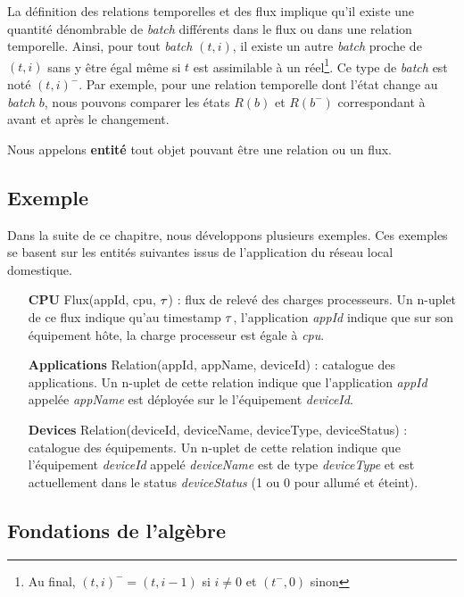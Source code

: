La définition des relations temporelles et des flux implique qu'il existe une quantité dénombrable de \textit{batch} différents dans le flux ou dans une relation temporelle. Ainsi, pour tout \textit{batch} $(t,i)$, il existe un autre \textit{batch} proche de $(t,i)$ sans y être égal même si $t$ est assimilable à un réel\footnote{Au final, $(t,i)^- = (t,i-1)$ si $i\neq 0$ et $(t^-,0)$ sinon}. Ce type de \textit{batch} est noté $(t,i)^-$. Par exemple, pour une relation temporelle dont l'état change au \textit{batch} $b$, nous pouvons comparer les états $R(b)$ et $R(b^-)$ correspondant à avant et après le changement.

Nous appelons \textbf{entité} tout objet pouvant être une relation ou un flux.

\subsection{Exemple}\label{sec:contrib:astral:definitions:exemple}
Dans la suite de ce chapitre, nous développons plusieurs exemples. Ces exemples se basent sur les entités suivantes issus de l'application du réseau local domestique.
\begin{itemize}
    \item[\textbf{CPU}] Flux(appId, cpu, $\tau$) : flux de relevé des charges processeurs. Un n-uplet de ce flux indique qu'au timestamp $\tau$, l'application \textit{appId} indique que sur son équipement hôte, la charge processeur est égale à \textit{cpu}.
    \item[\textbf{Applications}] Relation(appId, appName, deviceId) : catalogue des applications. Un n-uplet de cette relation indique que l'application \textit{appId} appelée \textit{appName} est déployée sur le l'équipement \textit{deviceId}.
    \item[\textbf{Devices}] Relation(deviceId, deviceName, deviceType, deviceStatus) : catalogue des équipements. Un n-uplet de cette relation indique que l'équipement \textit{deviceId} appelé \textit{deviceName} est de type \textit{deviceType} et est actuellement dans le status \textit{deviceStatus} (1 ou 0 pour allumé et éteint).
\end{itemize}

\subsection{Fondations de l'algèbre}
